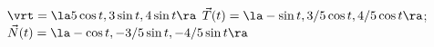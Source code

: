 {$\vrt = \la 5\cos t,3\sin t,4\sin t \ra$
}
{$\vec T(t) = \la -\sin t, 3/5\cos t, 4/5\cos t\ra$; $\vec N(t) = \la -\cos t,-3/5\sin t,-4/5\sin t\ra$
}
